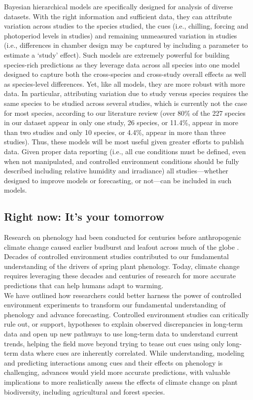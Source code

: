 \documentclass[11pt,letter]{article}
\begin{document}
Bayesian hierarchical models are specifically designed for analysis of diverse datasets. With the right information and sufficient data, they can attribute variation across studies to the species studied, the cues (i.e., chilling, forcing and photoperiod levels in studies) and remaining unmeasured variation in studies (i.e., differences in chamber design may be captured by including a parameter to estimate a `study' effect). Such models are extremely powerful for building species-rich predictions as they leverage data across all species into one model designed to capture both the cross-species and cross-study overall effects as well as species-level differences. Yet, like all models, they are more robust with more data. In particular, attributing variation due to study versus species requires the same species to be studied across several studies, which is currently not the case for most species, according to our literature review (over 80\% of the 227 species in our dataset appear in only one study, 26 species, or 11.4\%, appear in more than two studies and only 10 species, or 4.4\%, appear in more than three studies). Thus, these models will be most useful given greater efforts to publish data. Given proper data reporting (i.e., all cue conditions must be defined, even when not manipulated, and controlled environment conditions should be fully described including relative humidity and irradiance) all studies---whether designed to improve models or forecasting, or not---can be included in such models. 

\subsection{Right now: It's your tomorrow}
Research on phenology had been conducted for centuries before anthropogenic climate change caused earlier budburst and leafout across much of the globe \citep{Sparks:1995mv}. Decades of controlled environment studies contributed to our fundamental understanding of the drivers of spring plant phenology. Today, climate change requires leveraging these decades and centuries of research for more accurate predictions that can help humans adapt to warming. \\

We have outlined how researchers could better harness the power of controlled environment experiments to transform our fundamental understanding of phenology and advance forecasting. Controlled environment studies can critically rule out, or support, hypotheses to explain observed discrepancies in long-term data and open up new pathways to use long-term data to understand current trends, helping the field move beyond trying to tease out cues using only long-term data where cues are inherently correlated. While understanding, modeling and predicting interactions among cues and their effects on phenology is challenging, advances would yield more accurate predictions, with valuable implications to more realistically assess the effects of climate change on plant biodiversity, including agricultural and forest species. 
\end{document}

